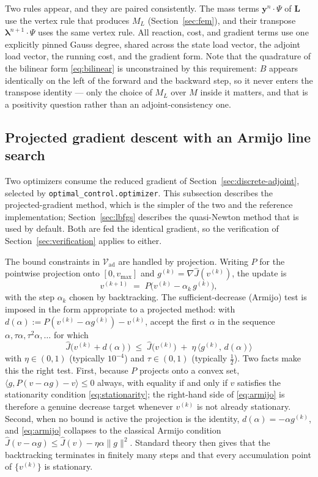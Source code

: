 \documentclass[11pt]{article}
\newcommand{\Vad}{\mathcal{V}_{\mathrm{ad}}}
\begin{document}
Two rules appear, and they are paired consistently. The mass terms $\mathbf{y}^n\!\cdot\!\Psi$ of $\mathbf{L}$ use the vertex rule that produces $M_L$ (Section~\ref{sec:fem}), and their transpose $\boldsymbol\lambda^{n+1}\!\cdot\!\Psi$ uses the same vertex rule. All reaction, cost, and gradient terms use one explicitly pinned Gauss degree, shared across the state load vector, the adjoint load vector, the running cost, and the gradient form. Note that the quadrature of the bilinear form \eqref{eq:bilinear} is unconstrained by this requirement: $B$ appears identically on the left of the forward and the backward step, so it never enters the transpose identity --- only the choice of $M_L$ over $M$ inside it matters, and that is a positivity question rather than an adjoint-consistency one.

\subsection{Projected gradient descent with an Armijo line search}
\label{sec:algorithm}

Two optimizers consume the reduced gradient of Section~\ref{sec:discrete-adjoint}, selected by \texttt{optimal\_control.optimizer}. This subsection describes the projected-gradient method, which is the simpler of the two and the reference implementation; Section~\ref{sec:lbfgs} describes the quasi-Newton method that is used by default. Both are fed the identical gradient, so the verification of Section~\ref{sec:verification} applies to either.

The bound constraints in $\Vad$ are handled by projection. Writing $P$ for the pointwise projection onto $[0,v_{\max}]$ and $g^{(k)} = \nabla\hat J(v^{(k)})$, the update is
\begin{equation}
v^{(k+1)} \;=\; P\big(v^{(k)} - \alpha_k\,g^{(k)}\big),
\end{equation}
with the step $\alpha_k$ chosen by backtracking. The sufficient-decrease (Armijo) test is imposed in the form appropriate to a projected method: with $d(\alpha) := P(v^{(k)}-\alpha g^{(k)}) - v^{(k)}$, accept the first $\alpha$ in the sequence $\alpha,\tau\alpha,\tau^2\alpha,\dots$ for which
\begin{equation}
\boxed{\;\hat J\big(v^{(k)} + d(\alpha)\big) \;\le\; \hat J\big(v^{(k)}\big) \;+\; \eta\,\big\langle g^{(k)},\,d(\alpha)\big\rangle\;}
\label{eq:armijo}
\end{equation}
with $\eta\in(0,1)$ (typically $10^{-4}$) and $\tau\in(0,1)$ (typically $\tfrac12$). Two facts make this the right test. First, because $P$ projects onto a convex set, $\langle g, P(v-\alpha g)-v\rangle \le 0$ always, with equality if and only if $v$ satisfies the stationarity condition \eqref{eq:stationarity}; the right-hand side of \eqref{eq:armijo} is therefore a genuine decrease target whenever $v^{(k)}$ is not already stationary. Second, when no bound is active the projection is the identity, $d(\alpha) = -\alpha g^{(k)}$, and \eqref{eq:armijo} collapses to the classical Armijo condition $\hat J(v-\alpha g)\le \hat J(v) - \eta\alpha\lVert g\rVert^2$. Standard theory \citep{Nocedal2006} then gives that the backtracking terminates in finitely many steps and that every accumulation point of $\{v^{(k)}\}$ is stationary.
\end{document}

